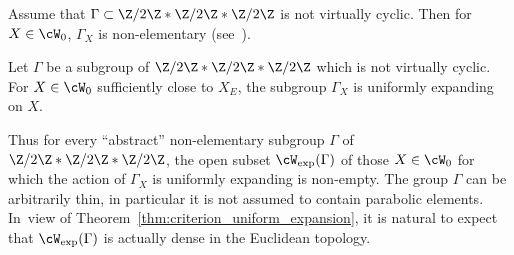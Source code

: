 Assume that $\Gamma\subset \Z/2\Z\ast\Z/2\Z\ast\Z/2\Z$ is not virtually cyclic. Then for $X\in \cW_0$, $\Gamma_X$ is non-elementary (see~\cite[\S 3]{stiffness}).

\begin{thm}\label{thm:thin}
Let $\Gamma$ be a subgroup of $\Z/2\Z\ast\Z/2\Z\ast\Z/2\Z$ which is not virtually cyclic.
For $X\in \cW_0$ sufficiently close to $X_E$, the subgroup $\Gamma_X$ is uniformly expanding on $X$.
\end{thm}

Thus for every ``abstract'' non-elementary subgroup $\Gamma$ of $\Z/2\Z\ast\Z/2\Z\ast\Z/2\Z$, the open
subset $\cW_{\exp}(\Gamma)$ of those $X\in \cW_0$ for which the action of $\Gamma_X$ is uniformly expanding is non-empty.
The group $\Gamma$ can be arbitrarily thin, in particular it is not assumed to contain parabolic elements. In~view of Theorem~\ref{thm:criterion_uniform_expansion}, it is natural to expect that $\cW_{\exp}(\Gamma)$ is actually dense in the Euclidean topology.

